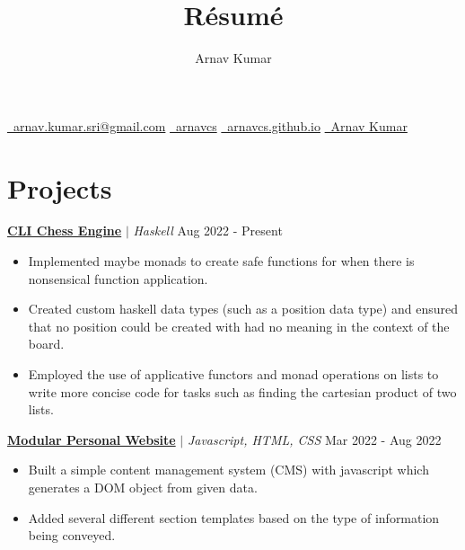 \documentclass{article}
\makeatletter
\newcommand{\smallbullet}{\,\begin{picture}(-1,1)(-1,-3)\circle*{3}\end{picture}\ }
\renewcommand{\maketitle}{
    \begin{center}
    {\color{MyBlue3}\Huge\bfseries
        \theauthor
    }

    \vspace{0.3em}
    {
        \href{mailto:arnav.kumar.sri@gmail.com}{\faEnvelope \ arnav.kumar.sri@gmail.com} \quad
        \href{https://github.com/arnavcs}{\faGithub \ arnavcs} \quad
        \href{https://arnavcs.github.io/}{\faGlobe \ arnavcs.github.io} \quad
        \href{https://www.linkedin.com/in/arnav-kumar-0644881a3/}{\faLinkedin \ Arnav Kumar}
    }
    \vspace{-1em}
    \end{center}
}
\newenvironment{resumeItem}
{
    \vspace{0.5em}
}
{
}
\newcommand{\projectHead}[3]{
    \textbf{#1} $\vert$ \textit{#2} \hfill #3 \\[-1.2em]
}
\newenvironment{resumeList}
{
    \begin{itemize}[label=\smallbullet]
}
{
    \end{itemize}
}
\makeatother
\begin{document}
\title{R\'esum\'e}
\author{Arnav Kumar}

\maketitle


\section{Projects}

\begin{resumeItem}
\projectHead{\href{https://github.com/arnavcs/cli-chess-engine}{CLI Chess Engine}}{Haskell}{Aug 2022 - Present}
\begin{resumeList}
    \item Implemented maybe monads to create safe functions for when there is nonsensical function application.
    \item Created custom haskell data types (such as a position data type) and ensured that no position could be created with had no meaning in the context of the board.
    \item Employed the use of applicative functors and monad operations on lists to write more concise code for tasks such as finding the cartesian product of two lists.
\end{resumeList}
\end{resumeItem}

\begin{resumeItem}
\projectHead{\href{https://github.com/arnavcs/arnavcs.github.io}{Modular Personal Website}}{Javascript, HTML, CSS}{Mar 2022 - Aug 2022}
\begin{resumeList}
    \item Built a simple content management system (CMS) with javascript which generates a DOM object from given data.
    \item Added several different section templates based on the type of information being conveyed.
\end{resumeList}
\end{resumeItem}

\end{document}
